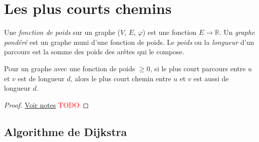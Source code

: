 \section{Les plus courts chemins}
\begin{mydef}
  Une \emph{fonction de poids} sur un graphe ($V$, $E$, $\varphi$) est une fonction $E \to \mathbb{R}$. Un \emph{graphe pondéré} est un graphe muni d’une fonction de poids. Le \emph{poids} ou la \emph{longueur} d’un parcours est la somme des poids des arêtes qui le compose.
\end{mydef}

\begin{mytheo} 
  Pour un graphe avec une fonction de poids $\geq 0$, si le plus court parcours entre $u$ et $v$ est de longueur $d$, alors le plus court chemin entre $u$ et $v$ est aussi de longueur $d$.
  \begin{proof}
     \href{https://dl.dropboxusercontent.com/u/44092863/Graph_Theory_Romain_Capron.pdf}{Voir notes} \textcolor{red}{TODO}
  \end{proof}
\end{mytheo}

\subsection{Algorithme de Dijkstra}
\begin{myalgo}
\end{myalgo}

